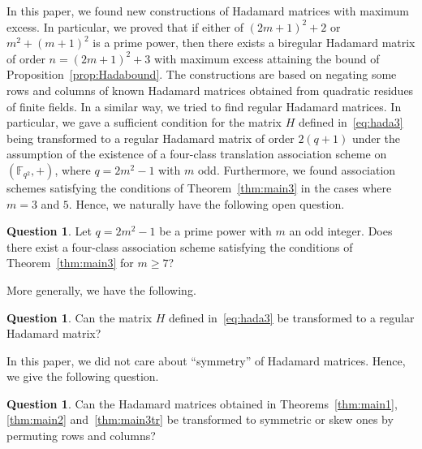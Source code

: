 \documentclass[10pt]{amsart}
\theoremstyle{definition}
\newtheorem{ques}[theo]{Question}
\newcommand*\F{{\mathbb F}}
\begin{document}
In this paper, we found new constructions of Hadamard matrices with maximum excess. In particular, we proved that if either of $(2m+1)^2+2$ or $m^2+(m+1)^2$ is a prime power, then there exists a biregular Hadamard matrix of order $n=(2m+1)^2+3$ with maximum excess attaining the bound of Proposition~\ref{prop:Hadabound}. The constructions are based on negating some rows and columns of known Hadamard matrices obtained from quadratic residues of finite fields. In a similar way, we tried to find regular Hadamard matrices. In particular, we gave a sufficient condition for the matrix $H$ defined in~\eqref{eq:hada3} being transformed to a regular Hadamard matrix of order $2(q+1)$ under the assumption of the existence of a four-class translation association scheme on $(\F_{q^2},+)$, where $q=2m^2-1$ with $m$ odd. Furthermore, we found association schemes satisfying the conditions of Theorem~\ref{thm:main3} in the cases where $m=3$ and $5$. Hence, we naturally have the following open question.

\begin{ques}
Let $q=2m^2-1$ be a prime power with $m$ an odd integer. Does there exist a four-class association scheme satisfying the conditions of Theorem~\ref{thm:main3} for $m\ge 7$?
\end{ques}

More generally, we have the following.

\begin{ques}
Can the matrix $H$ defined in~\eqref{eq:hada3} be transformed to a regular Hadamard matrix?
\end{ques}

In this paper, we did not care about ``symmetry'' of Hadamard matrices. Hence, we give the following question.

\begin{ques}
Can the Hadamard matrices obtained in Theorems~\ref{thm:main1}, \ref{thm:main2} and~\ref{thm:main3tr} be transformed to symmetric or skew ones by permuting rows and columns?
\end{ques}
\end{document}
